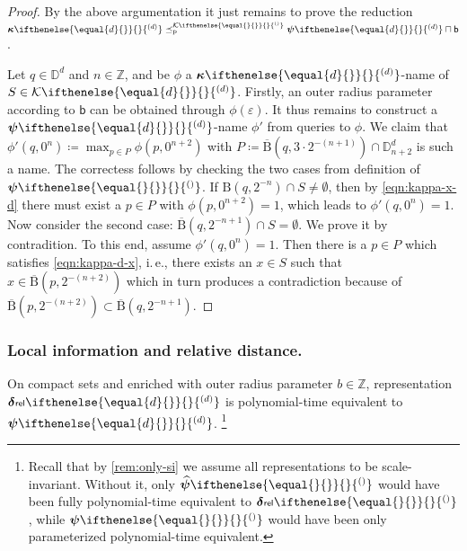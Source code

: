 \documentclass{CSML}
\newcommand{\representation}[2]{ #1\ifnotempty{#2}{^{(#2)}} }
\newcommand{\ID}{\mathbb{D}}
\newcommand{\IZ}{\mathbb{Z}}
\newcommand{\reldistrep}[1][\empty]{ \representation{%
	\bm{\delta}\kern.05ex{\scriptstyle\mathsf{rel}}\kern.1ex%
	}{#1} }
\newcommand{\setrep}[1][\empty]{ \representation{\bm{\psi}}{#1} }
\newcommand{\sisetrep}[1][\empty]{ \representation{ \widehat{\bm{\psi}} }{#1} }
\newcommand{\gridrep}[1][\empty]{ \representation{\bm{\kappa}}{#1} }
\newcommand{\compset}[1][\empty]{ \representation{\mathcal{K}}{#1} }
\newcommand{\ifnotempty}[2]{ \ifthenelse{ \equal{#1}{\empty} }{}{#2} }
\newcommand{\pleq}{\preceq_\mathrm{p}}
\newcommand{\ball}{\mathrm{B}}
\newcommand{\cls}[1]{\overline{#1}}
\newcommand{\cball}{\cls{\ball}}
\newcommand{\dfeq}{\coloneqq}
\newcommand{\ie}{\mbox{i.\,e.}\xspace}
\newcommand{\enp}[1]{\sqcap \mathsf{#1}}
\newcommand{\ens}[1]{\mathsf{#1}}
\newcommand{\eword}{\varepsilon}
\begin{document}
\begin{proof}
By the above argumentation it just remains to prove the reduction
$\gridrep[d] \pleq^{\compset} \setrep[d] \enp{b}$.

Let $q \in \ID^d$ and $n \in \IZ$, and be $\phi$ a $\gridrep[d]$-name of
$S \in \compset[d]$.
Firstly, an outer radius parameter according to $\ens{b}$ can be obtained
through $\phi(\eword)$.
It thus remains to construct a $\setrep[d]$-name $\phi'$ from queries to
$\phi$.
We claim that $\phi'(q,0^n) \dfeq \max_{p \in P} \phi(p,0^{n+2})$ with
$P \dfeq \cball(q,3 \cdot 2^{-(n+1)}) \cap \ID^d_{n+2}$ is such a name.
The correctess follows by checking the two cases from definition of $\setrep$.
If $\ball(q,2^{-n}) \cap S \neq \emptyset$, then by \ref{eqn:kappa-x-d} there
must exist a $p \in P$ with $\phi(p,0^{n+2}) = 1$, which leads to
$\phi'(q,0^n) = 1$.
Now consider the second case: $\cball(q,2^{-n+1}) \cap S = \emptyset$.
We prove it by contradition.
To this end, assume $\phi'(q,0^n) = 1$.
Then there is a $p \in P$ which satisfies \ref{eqn:kappa-d-x}, \ie,
there exists an $x \in S$ such that $x \in \cball(p,2^{-(n+2)})$ which in
turn produces a contradiction because of
$\cball(p,2^{-(n+2)}) \subset \cball(q,2^{-n+1})$.
\qedhere
\end{proof}




\subsubsection{Local information and relative distance.}


On compact sets and enriched with outer radius parameter $b \in \IZ$,
representation $\reldistrep[d]$ is polynomial-time equivalent to $\setrep[d]$.%
\footnote{%
	Recall that by \cref{rem:only-si} we assume all representations to be
	scale-invariant.
	Without it, only $\sisetrep$
	would have been fully polynomial-time equivalent to $\reldistrep$,
	while $\setrep$ would have been only parameterized polynomial-time equivalent.}
\end{document}
